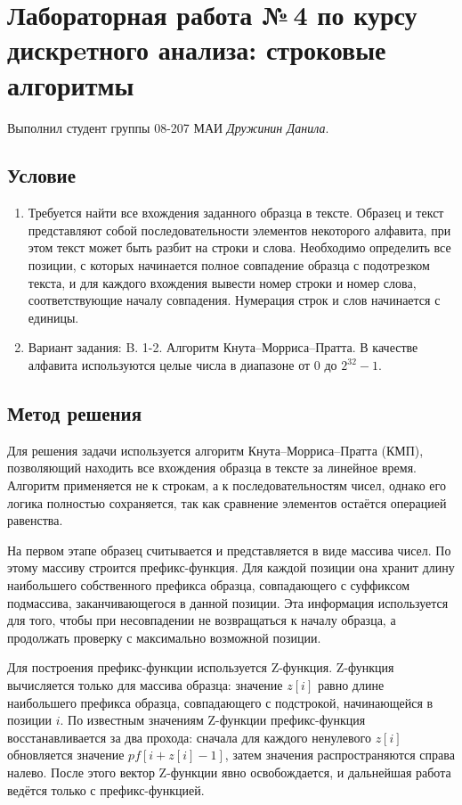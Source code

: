 \documentclass[12pt]{article}
\begin{document}
\section*{Лабораторная работа №\,4 по курсу дискрeтного анализа: строковые алгоритмы}

Выполнил студент группы 08-207 МАИ \textit{Дружинин Данила}.

\subsection*{Условие}

\begin{enumerate}
	\item 
	
	Требуется найти все вхождения заданного образца в тексте. Образец и текст представляют собой последовательности элементов некоторого алфавита, при этом текст может быть разбит на строки и слова. Необходимо определить все позиции, с которых начинается полное совпадение образца с подотрезком текста, и для каждого вхождения вывести номер строки и номер слова, соответствующие началу совпадения. Нумерация строк и слов начинается с единицы.
	
	\item Вариант задания: B. 1-2. Алгоритм Кнута–Морриса–Пратта. В качестве алфавита используются целые числа в диапазоне от $0$ до $2^{32}-1$.
\end{enumerate}

\subsection*{Метод решения}

Для решения задачи используется алгоритм Кнута–Морриса–Пратта (КМП), позволяющий находить все вхождения образца в тексте за линейное время. Алгоритм применяется не к строкам, а к последовательностям чисел, однако его логика полностью сохраняется, так как сравнение элементов остаётся операцией равенства.

На первом этапе образец считывается и представляется в виде массива чисел. По этому массиву строится префикс-функция. Для каждой позиции она хранит длину наибольшего собственного префикса образца, совпадающего с суффиксом подмассива, заканчивающегося в данной позиции. Эта информация используется для того, чтобы при несовпадении не возвращаться к началу образца, а продолжать проверку с максимально возможной позиции.

Для построения префикс-функции используется Z-функция. Z-функция вычисляется только для массива образца: значение $z[i]$ равно длине наибольшего префикса образца, совпадающего с подстрокой, начинающейся в позиции $i$. По известным значениям Z-функции префикс-функция восстанавливается за два прохода: сначала для каждого ненулевого $z[i]$ обновляется значение $pf[i + z[i] - 1]$, затем значения распространяются справа налево. После этого вектор Z-функции явно освобождается, и дальнейшая работа ведётся только с префикс-функцией.
\end{document}

